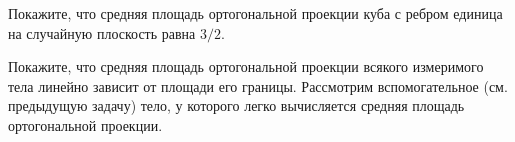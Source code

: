\begin{problem}
Покажите, что средняя площадь ортогональной проекции куба с ребром единица на случайную плоскость равна $3/2$. 
\end{problem}

\begin{ordre}
Покажите, что  средняя площадь  ортогональной проекции всякого измеримого тела 
линейно зависит от площади его границы. 
Рассмотрим вспомогательное (см. предыдущую задачу) тело, у которого легко вычисляется средняя площадь ортогональной проекции. 
\end{ordre}




